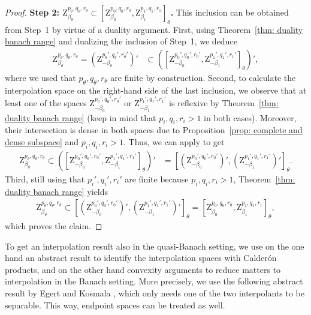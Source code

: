 \documentclass[11pt, leqno,parskip=half]{amsart}
\theoremstyle{definition}
\newcommand{\Z}{\mathrm{Z}}
\numberwithin{equation}{section}
\begin{document}
\begin{proof}
    \noindent \textbf{Step 2: $ \Z^{p_\theta, q_\theta,r_\theta}_{\beta_\theta}\subset [\Z^{p_0,q_0,r_0}_{\beta_0} , \Z^{p_1,q_1,r_1}_{\beta_1} ]_{\theta} $.}
    This inclusion can be obtained from Step~1 by virtue of a duality argument. First, using Theorem~\ref{thm: duality banach range} and dualizing the inclusion of Step~1, we deduce
    \begin{align*}
        \Z^{p_\theta, q_\theta,r_\theta}_{\beta_\theta} = (\Z^{p_\theta', q_\theta',r_\theta'}_{-\beta_\theta})' &\subset ([\Z^{p_0',q_0',r_0'}_{-\beta_0} , \Z^{p_1',q_1',r_1'}_{-\beta_1} ]_{\theta})',
    \end{align*}
    where we used that $p_\theta, q_\theta,r_\theta$ are finite by construction. Second, to calculate the interpolation space on the right-hand side of the last inclusion,
    we observe that at least one of the spaces $\Z^{p_0',q_0',r_0'}_{-\beta_0} $ or $\Z^{p_1',q_1',r_1'}_{-\beta_1}$ is reflexive by Theorem~\ref{thm: duality banach range} (keep in mind that $p_i, q_i, r_i > 1$ in both cases). Moreover, their intersection is dense in both spaces due to Proposition~\ref{prop: complete and dense subspace} and $p_i, q_i, r_i > 1$. Thus, we can apply \cite[Cor.\@ 4.5.2]{Bergh_Loefstroem} to get
    \begin{align*}
         \Z^{p_\theta, q_\theta,r_\theta}_{\beta_\theta} \subset([\Z^{p_0',q_0',r_0'}_{-\beta_0} , \Z^{p_1',q_1',r_1'}_{-\beta_1} ]_{\theta})'
        &= [(\Z^{p_0',q_0',r_0'}_{-\beta_0})' , (\Z^{p_1',q_1',r_1'}_{-\beta_1})']_{\theta}.
    \end{align*}
    Third, still using that $p_i',q_i',r_i'$ are finite because $p_i,q_i,r_i>1$, Theorem~\ref{thm: duality banach range} yields
    \begin{align*}
        \Z^{p_\theta, q_\theta,r_\theta}_{\beta_\theta} \subset  [(\Z^{p_0',q_0',r_0'}_{-\beta_0})' , (\Z^{p_1',q_1',r_1'}_{-\beta_1})' ]_{\theta}
        =[\Z^{p_0,q_0,r_0}_{\beta_0} , \Z^{p_1,q_1,r_1}_{\beta_1} ]_{\theta},
    \end{align*}
    which proves the claim.
\end{proof}

To get an interpolation result also in the quasi-Banach setting, we use on the one hand an abstract result to identify the interpolation spaces with Calderón products, and on the other hand convexity arguments to reduce matters to interpolation in the Banach setting. More precisely, we use the following abstract result by Egert and Kosmala \cite[Thm.\@ 1.1]{Egert_Kosmala}, which only needs one of the two interpolants to be separable. This way, endpoint spaces can be treated as well.\\
\end{document}

